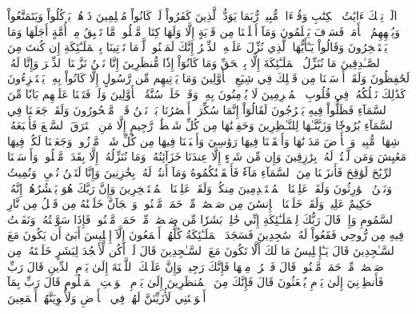الٓرۚ تِلۡكَ ءَايَٰتُ ٱلۡكِتَٰبِ وَقُرۡءَانٖ مُّبِينٖ
رُّبَمَا يَوَدُّ ٱلَّذِينَ كَفَرُواْ لَوۡ كَانُواْ مُسۡلِمِينَ
ذَرۡهُمۡ يَأۡكُلُواْ وَيَتَمَتَّعُواْ وَيُلۡهِهِمُ ٱلۡأَمَلُۖ فَسَوۡفَ يَعۡلَمُونَ
وَمَآ أَهۡلَكۡنَا مِن قَرۡيَةٍ إِلَّا وَلَهَا كِتَابٞ مَّعۡلُومٞ
مَّا تَسۡبِقُ مِنۡ أُمَّةٍ أَجَلَهَا وَمَا يَسۡتَـٔۡخِرُونَ
وَقَالُواْ يَـٰٓأَيُّهَا ٱلَّذِي نُزِّلَ عَلَيۡهِ ٱلذِّكۡرُ إِنَّكَ لَمَجۡنُونٞ
لَّوۡمَا تَأۡتِينَا بِٱلۡمَلَـٰٓئِكَةِ إِن كُنتَ مِنَ ٱلصَّـٰدِقِينَ
مَا نُنَزِّلُ ٱلۡمَلَـٰٓئِكَةَ إِلَّا بِٱلۡحَقِّ وَمَا كَانُوٓاْ إِذٗا مُّنظَرِينَ
إِنَّا نَحۡنُ نَزَّلۡنَا ٱلذِّكۡرَ وَإِنَّا لَهُۥ لَحَٰفِظُونَ
وَلَقَدۡ أَرۡسَلۡنَا مِن قَبۡلِكَ فِي شِيَعِ ٱلۡأَوَّلِينَ
وَمَا يَأۡتِيهِم مِّن رَّسُولٍ إِلَّا كَانُواْ بِهِۦ يَسۡتَهۡزِءُونَ
كَذَٰلِكَ نَسۡلُكُهُۥ فِي قُلُوبِ ٱلۡمُجۡرِمِينَ
لَا يُؤۡمِنُونَ بِهِۦ وَقَدۡ خَلَتۡ سُنَّةُ ٱلۡأَوَّلِينَ
وَلَوۡ فَتَحۡنَا عَلَيۡهِم بَابٗا مِّنَ ٱلسَّمَآءِ فَظَلُّواْ فِيهِ يَعۡرُجُونَ
لَقَالُوٓاْ إِنَّمَا سُكِّرَتۡ أَبۡصَٰرُنَا بَلۡ نَحۡنُ قَوۡمٞ مَّسۡحُورُونَ
وَلَقَدۡ جَعَلۡنَا فِي ٱلسَّمَآءِ بُرُوجٗا وَزَيَّنَّـٰهَا لِلنَّـٰظِرِينَ
وَحَفِظۡنَٰهَا مِن كُلِّ شَيۡطَٰنٖ رَّجِيمٍ
إِلَّا مَنِ ٱسۡتَرَقَ ٱلسَّمۡعَ فَأَتۡبَعَهُۥ شِهَابٞ مُّبِينٞ
وَٱلۡأَرۡضَ مَدَدۡنَٰهَا وَأَلۡقَيۡنَا فِيهَا رَوَٰسِيَ وَأَنۢبَتۡنَا فِيهَا مِن كُلِّ شَيۡءٖ مَّوۡزُونٖ
وَجَعَلۡنَا لَكُمۡ فِيهَا مَعَٰيِشَ وَمَن لَّسۡتُمۡ لَهُۥ بِرَٰزِقِينَ
وَإِن مِّن شَيۡءٍ إِلَّا عِندَنَا خَزَآئِنُهُۥ وَمَا نُنَزِّلُهُۥٓ إِلَّا بِقَدَرٖ مَّعۡلُومٖ
وَأَرۡسَلۡنَا ٱلرِّيَٰحَ لَوَٰقِحَ فَأَنزَلۡنَا مِنَ ٱلسَّمَآءِ مَآءٗ فَأَسۡقَيۡنَٰكُمُوهُ وَمَآ أَنتُمۡ لَهُۥ بِخَٰزِنِينَ
وَإِنَّا لَنَحۡنُ نُحۡيِۦ وَنُمِيتُ وَنَحۡنُ ٱلۡوَٰرِثُونَ
وَلَقَدۡ عَلِمۡنَا ٱلۡمُسۡتَقۡدِمِينَ مِنكُمۡ وَلَقَدۡ عَلِمۡنَا ٱلۡمُسۡتَـٔۡخِرِينَ
وَإِنَّ رَبَّكَ هُوَ يَحۡشُرُهُمۡۚ إِنَّهُۥ حَكِيمٌ عَلِيمٞ
وَلَقَدۡ خَلَقۡنَا ٱلۡإِنسَٰنَ مِن صَلۡصَٰلٖ مِّنۡ حَمَإٖ مَّسۡنُونٖ
وَٱلۡجَآنَّ خَلَقۡنَٰهُ مِن قَبۡلُ مِن نَّارِ ٱلسَّمُومِ
وَإِذۡ قَالَ رَبُّكَ لِلۡمَلَـٰٓئِكَةِ إِنِّي خَٰلِقُۢ بَشَرٗا مِّن صَلۡصَٰلٖ مِّنۡ حَمَإٖ مَّسۡنُونٖ
فَإِذَا سَوَّيۡتُهُۥ وَنَفَخۡتُ فِيهِ مِن رُّوحِي فَقَعُواْ لَهُۥ سَٰجِدِينَ
فَسَجَدَ ٱلۡمَلَـٰٓئِكَةُ كُلُّهُمۡ أَجۡمَعُونَ
إِلَّآ إِبۡلِيسَ أَبَىٰٓ أَن يَكُونَ مَعَ ٱلسَّـٰجِدِينَ
قَالَ يَـٰٓإِبۡلِيسُ مَا لَكَ أَلَّا تَكُونَ مَعَ ٱلسَّـٰجِدِينَ
قَالَ لَمۡ أَكُن لِّأَسۡجُدَ لِبَشَرٍ خَلَقۡتَهُۥ مِن صَلۡصَٰلٖ مِّنۡ حَمَإٖ مَّسۡنُونٖ
قَالَ فَٱخۡرُجۡ مِنۡهَا فَإِنَّكَ رَجِيمٞ
وَإِنَّ عَلَيۡكَ ٱللَّعۡنَةَ إِلَىٰ يَوۡمِ ٱلدِّينِ
قَالَ رَبِّ فَأَنظِرۡنِيٓ إِلَىٰ يَوۡمِ يُبۡعَثُونَ
قَالَ فَإِنَّكَ مِنَ ٱلۡمُنظَرِينَ
إِلَىٰ يَوۡمِ ٱلۡوَقۡتِ ٱلۡمَعۡلُومِ
قَالَ رَبِّ بِمَآ أَغۡوَيۡتَنِي لَأُزَيِّنَنَّ لَهُمۡ فِي ٱلۡأَرۡضِ وَلَأُغۡوِيَنَّهُمۡ أَجۡمَعِينَ
